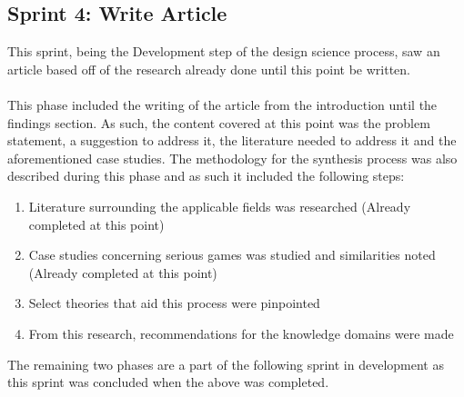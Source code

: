 \subsection{Sprint 4: Write Article}
This sprint, being the Development step of the design science process, saw an article based off of the research already done until this point be written. 
\\\\
This phase included the writing of the article from the introduction until the findings section. As such, the content covered at this point was the problem statement, a suggestion to address it, the literature needed to address it and the aforementioned case studies. The methodology for the synthesis process was also described during this phase and as such it included the following steps:
\begin{enumerate}
\item Literature surrounding the applicable fields was researched (Already completed at this point)
\item Case studies concerning serious games was studied and similarities noted (Already completed at this point)
\item Select theories that aid this process were pinpointed 
\item From this research, recommendations for the knowledge domains were made
\end{enumerate}

\noindent The remaining two phases are a part of the following sprint in development as this sprint was concluded when the above was completed.


